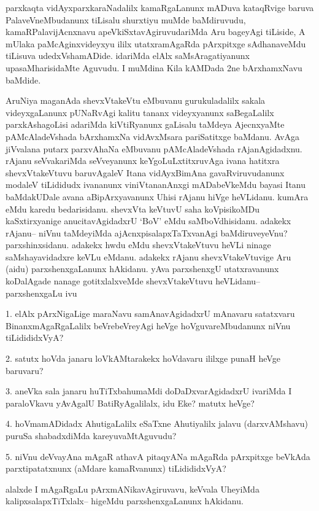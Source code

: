 \begin{artha}
parxkaqta vidAyxparxkaraNadalilx kamaRgaLanunx mADuva kataqRvige baruva PalaveV\-neMbudanunx tiLisalu shurxtiyu muMde baMdiruvudu, kamaRPalavijAcnxnavu apeVkiSxtavAgiruvudariMda Aru bageyAgi tiLiside, A mUlaka paMcAginxvideyxyu ililx utatxramAgaRda pArxpitxge sAdhanaveMdu tiLisuva udedxVshamADide. idariMda elAlx saMsAragatiyanunx upasaMharisidaMte Aguvudu. I muMdina Kila kAMDada 2ne bArxhamxNavu baMdide.
\end{artha}

\begin{artha}
AruNiya maganAda shevxVtakeVtu eMbuvanu gurukuladalilx sakala videyxgaLanunx pUNaRvAgi kalitu tananx videyxyanunx saBegaLalilx  parxkAshagoLisi adariMda kiVtiRyanunx gaLisalu taMdeya AjecnxyaMte pAMcAladeVshada bArxhamxNa vidAvxMsara pariSatitxge baMdanu. AvAga jiVvalana putarx parxvAhaNa eMbuvanu pAMcAladeVshada rAjanAgidadxnu. rAjanu seVvakariMda seVveyanunx keYgoLuLxtitxruvAga ivana hatitxra shevxVtakeVtuvu baruvAgaleV Itana vidAyxBimAna gavaRviruvudanunx modaleV tiLididudx ivananunx viniVtananAnxgi mADabeVkeMdu  bayasi Itanu baMdakUDale avana aBipArxyavanunx Uhisi rAjanu hiVge heVLidanu. kumAra eMdu karedu bedarisidanu. shevxVta keVtuvU saha koVpisikoMDu kaSxtirxyanige anucitavAgidadxrU `BoV' eMdu saMboVdhisidanu. adakekx rAjanu-- niVnu taMdeyiMda ajAcnxpisalapxTaTxvanAgi baMdiruveyeVnu? parxshinxsidanu. adakekx hwdu eMdu shevxVtakeVtuvu heVLi ninage saMshayavidadxre keVLu eMdanu. adakekx rAjanu shevxVtakeVtuvige Aru (aidu) parxshenxgaLanunx hAkidanu. yAva parxshenxgU utatxravanunx koDalAgade nanage gotitxlalxveMde shevxVtakeVtuvu heVLidanu-- parxshenxgaLu ivu

1. elAlx pArxNigaLige maraNavu samAnavAgidadxrU mAnavaru satatxvaru BinanxmAgaRgaLalilx beVrebeVreyAgi heVge hoVguvareMbudanunx niVnu tiLidididxVyA?

2. satutx hoVda janaru loVkAMtarakekx hoVdavaru ililxge punaH heVge baruvaru?

3. aneVka sala janaru huTiTxbahumaMdi doDaDxvarAgidadxrU ivariMda I paraloVkavu yAvAgalU BatiRyAgalilalx, idu Eke? matutx heVge?

4. hoVmamADidadx AhutigaLalilx eSaTxne Ahutiyalilx jalavu (darxvAMshavu) puruSa shabadxdiMda kareyuvaMtAguvudu?

5. niVnu deVvayAna mAgaR athavA pitaqyANa mAgaRda pArxpitxge beVkAda parxtipatatxnunx (aMdare kamaRvanunx) tiLidididxVyA?

alalxde I mAgaRgaLu pArxmANikavAgiruvavu, keVvala UheyiMda kalipxsalapxTiTxlalx-- higeMdu parxshenxgaLanunx hAkidanu. 
\end{artha}

